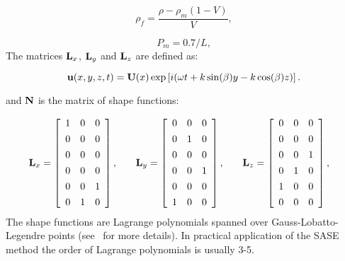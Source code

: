 \begin{equation}
		\rho_f = \frac{\rho - \rho_m (1-V)}{V},
\end{equation}
	  
\begin{equation}
    	P_m = 0.7/L,
    \end{equation}
	 The matrices \(\mathbf{L}_x\),  \(\mathbf{L}_y\) and  \(\mathbf{L}_z\) are defined as:
	 
\begin{equation}
	 \mathbf{u}(x,y,z,t) = \mathbf{U}(x) \exp \left[ i (\omega t + k \sin (\beta) y - k \cos (\beta) z)\right].
	 \end{equation}

	 and \(\mathbf{N}\) is the matrix of shape functions:
	  
\begin{equation}
	 \begin{split}
		 & \mathbf{L}_x = \left[\begin{array}{ccc} 
		 1 & 0 & 0  \\[4pt]
		 0&0&0\\[4pt]
		 0 &0&0  \\[4pt]
		 0&0&0\\[4pt]
		 0&0&1\\[4pt]
		  0&1&0 
		 \end{array} \right], 
	 \end{split} \quad 
	  \begin{split}
		  & \mathbf{L}_y = \left[\begin{array}{ccc} 
		 0&0&0\\[4pt]
		 0&1&0\\[4pt]
		 0 &0&0\\[4pt]
		 0&0&1\\[4pt]
		 0&0&0\\[4pt]
		 1&0&0 
		 \end{array} \right],
	 \end{split} \quad 
	 \begin{split}
	& \mathbf{L}_z = \left[\begin{array}{ccc} 
	0&0&0\\[4pt]
	0&0&0\\[4pt]
	0 &0&1\\[4pt]
	0&1&0\\[4pt]
	1&0&0\\[4pt]
	0&0&0 
	\end{array} \right],
	\end{split}
	\label{eq:selectors}\end{equation}
	 The shape functions are Lagrange polynomials spanned over Gauss-Lobatto-Legendre points (see~\cite{Kudela2007} for more details). In practical application of the SASE method the order of Lagrange polynomials is usually 3-5.
	 
